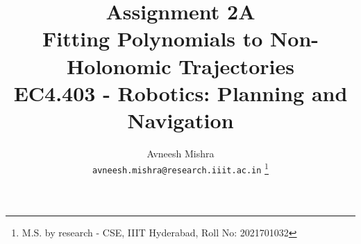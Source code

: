 

{
   \fancyhf{}
   \renewcommand{\headrulewidth}{0pt} %
}

\title{Assignment 2A \\
    \Large Fitting Polynomials to Non-Holonomic Trajectories \\
    \small EC4.403 - Robotics: Planning and Navigation
}

\author{
    Avneesh Mishra \\
    \texttt{avneesh.mishra@research.iiit.ac.in}
    \thanks{M.S. by research - CSE, IIIT Hyderabad, Roll No: 2021701032}
}


    \maketitle
    \thispagestyle{fancy_tr_rno}
    \tableofcontents
    \listoffigures
    \pagebreak
    
    \pagebreak
    
    \pagebreak
    
    \pagebreak
    
    \pagebreak
    
    \pagebreak
    
    \pagebreak
    
    \pagebreak
    \pagebreak
    \cleardoublepage
    \printbibliography
